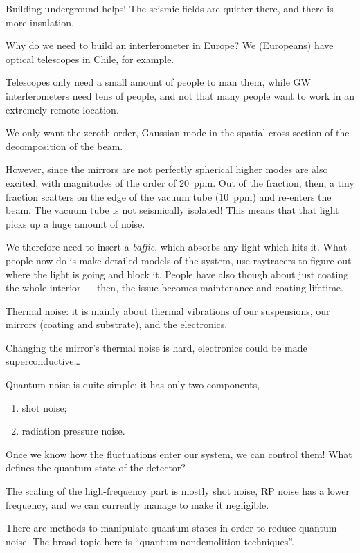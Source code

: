 \documentclass[main.tex]{subfiles}
\begin{document}
Building underground helps! The seismic fields are quieter there, and
there is more insulation. 

Why do we need to build an interferometer in Europe? We (Europeans) have optical telescopes in Chile, for example. 

Telescopes only need a small amount of people to man them, 
while GW interferometers need tens of people, and not that many people want to work in an extremely remote location.

We only want the zeroth-order, Gaussian mode in the spatial 
cross-section of the decomposition of the beam. 

However, since the mirrors are not perfectly spherical higher modes
are also excited, with magnitudes of the order of \SI{20}{ppm}. 
Out of the fraction, then, a tiny fraction scatters on the edge of the 
vacuum tube (\SI{10}{ppm}) and re-enters the beam.
The vacuum tube is not seismically isolated! 
This means that that light picks up a huge amount of noise. 

We therefore need to insert a \emph{baffle}, which 
absorbs any light which hits it. 
What people now do is make detailed models of the system, 
use raytracers to figure out where the light is going 
and block it. 
People have also though about just coating the whole interior --- then, the issue becomes maintenance and coating lifetime.

Thermal noise: it is mainly about thermal vibrations of 
our suspensions, our mirrors (coating and substrate), and the electronics.

Changing the mirror's thermal noise is hard, 
electronics could be made superconductive\dots

Quantum noise is quite simple: it has only two components, 
\begin{enumerate}
    \item shot noise;
    \item radiation pressure noise.
\end{enumerate}

Once we know how the fluctuations enter our system, we can control them! 
What defines the quantum state of the detector? 

The scaling of the high-frequency part is mostly shot noise, RP noise has a lower frequency, and we can currently manage to make it negligible.

There are methods to manipulate quantum states in order to reduce quantum noise. 
The broad topic here is ``quantum nondemolition techniques''. 
\end{document}
